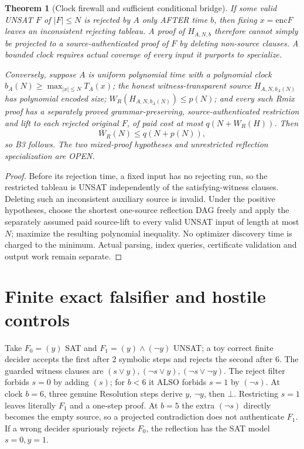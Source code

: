 \documentclass{article}
\newtheorem{theorem}{Theorem}
\begin{document}
\begin{theorem}[Clock firewall and sufficient conditional bridge]
If some valid UNSAT $F$ of $|F|\le N$ is rejected by $A$ only AFTER time $b$, then fixing $x=\mathrm{enc}F$ leaves an inconsistent rejecting tableau. A proof of $H_{A,N,b}$ therefore cannot simply be projected to a source-authenticated proof of $F$ by deleting non-source clauses. A bounded clock requires actual coverage of every input it purports to specialize.

Conversely, suppose $A$ is uniform polynomial time with a polynomial clock $b_A(N)\ge\max_{|x|\le N}T_A(x)$; the honest witness-transparent source $H_{A,N,b_A(N)}$ has polynomial encoded size; $W_R(H_{A,N,b_A(N)})\le p(N)$; and every such Rmix proof has a separately proved grammar-preserving, source-authenticated restriction and lift to each rejected original $F$, of paid cost at most $q(N+W_R(H))$. Then
\[
\overline W_R(N)\le q(N+p(N)),
\]
so B3 follows. The two mixed-proof hypotheses and unrestricted reflection specialization are OPEN.
\end{theorem}
\begin{proof}
Before its rejection time, a fixed input has no rejecting run, so the restricted tableau is UNSAT independently of the satisfying-witness clauses. Deleting such an inconsistent auxiliary source is invalid. Under the positive hypotheses, choose the shortest one-source reflection DAG freely and apply the separately assumed paid source-lift to every valid UNSAT input of length at most $N$; maximize the resulting polynomial inequality. No optimizer discovery time is charged to the minimum. Actual parsing, index queries, certificate validation and output work remain separate.
\end{proof}

\section*{Finite exact falsifier and hostile controls}
Take $F_0=(y)$ SAT and $F_1=(y)\land(\neg y)$ UNSAT; a toy correct finite decider accepts the first after 2 symbolic steps and rejects the second after 6. The guarded witness clauses are $(s\vee y),(\neg s\vee y),(\neg s\vee\neg y)$. The reject filter forbids $s=0$ by adding $(s)$; for $b<6$ it ALSO forbids $s=1$ by $(\neg s)$. At clock $b=6$, three genuine Resolution steps derive $y$, $\neg y$, then $\bot$. Restricting $s=1$ leaves literally $F_1$ and a one-step proof. At $b=5$ the extra $(\neg s)$ directly becomes the empty source, so a projected contradiction does not authenticate $F_1$. If a wrong decider spuriously rejects $F_0$, the reflection has the SAT model $s=0,y=1$.
\end{document}
